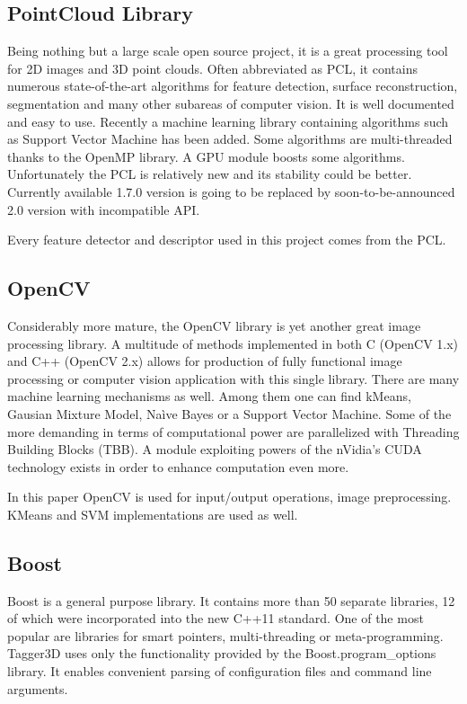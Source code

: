 	\subsection{PointCloud Library}
	Being nothing but a large scale open source project, it is a great processing tool for 2D images and 3D point clouds. Often abbreviated as PCL, it contains numerous state-of-the-art algorithms for feature detection, surface reconstruction, segmentation and many other subareas of computer vision. It is well documented and easy to use. Recently a machine learning library containing algorithms such as Support Vector Machine has been added. Some algorithms are multi-threaded thanks to the OpenMP library. A GPU module boosts some algorithms. Unfortunately the PCL is relatively new and its stability could be better. Currently available 1.7.0 version is going to be replaced by soon-to-be-announced 2.0 version with incompatible API.
	
	Every feature detector and descriptor used in this project comes from the PCL.
	
	\subsection{OpenCV}
	Considerably more mature, the OpenCV library is yet another great image processing library. A multitude of methods implemented in both C (OpenCV 1.x) and C++ (OpenCV 2.x) allows for production of fully functional image processing or computer vision application with this single library. There are many machine learning mechanisms as well. Among them one can find kMeans, Gausian Mixture Model, Na\`ive Bayes or a Support Vector Machine. Some of the more demanding in terms of computational power are parallelized with Threading Building Blocks (TBB). A module exploiting powers of the nVidia's CUDA technology exists in order to enhance computation even more.
	
	In this paper OpenCV is used for input/output operations, image preprocessing. KMeans and SVM implementations are used as well.
	
	\subsection{Boost}
	Boost is a general purpose library. It contains more than 50 separate libraries, 12 of which were incorporated into the new C++11 standard. One of the most popular are libraries for smart pointers, multi-threading or meta-programming. Tagger3D uses only the functionality provided by the Boost.program\_options library. It enables convenient parsing of configuration files and command line arguments.
		
